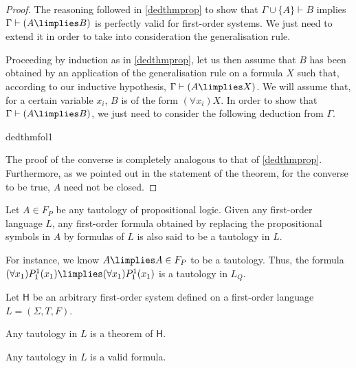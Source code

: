 \begin{proof}
The reasoning followed in \ref{dedthmprop} to show that $\Gamma\cup\{A\} \vdash B$ implies $\Gamma\vdash (A\limplies B)$ is perfectly valid for first-order systems. We just need to extend it in order to take into consideration the generalisation rule.

Proceeding by induction as in \ref{dedthmprop}, let us then assume that $B$ has been obtained by an application of the generalisation rule on a formula $X$ such that, according to our inductive hypothesis, $\Gamma \vdash (A\limplies X)$. We will assume that, for a certain variable $x_i$, $B$ is of the form $(\forall x_i) X$.
In order to show that $\Gamma \vdash  (A \limplies B)$, we just need to consider the following deduction from $\Gamma$.
\begin{deduction}{dedthmfol1}
\end{deduction}

The proof of the converse is completely analogous to that of \ref{dedthmprop}.
Furthermore, as we pointed out in the statement of the theorem, for the converse to be true, $A$ need not be closed.
\end{proof}

\begin{para}
Let $A\in F_P$ be any tautology of propositional logic. Given any first-order language $L$, any first-order formula obtained by replacing the propositional symbols in $A$ by formulas of $L$ is also said to be a tautology in $L$.

For instance, we know $A\limplies A \in F_P$ to be a tautology. Thus, the formula $(\forall x_1) P_1^1(x_1) \limplies (\forall x_1)P^1_1(x_1)$ is a tautology in $L_Q$.
\end{para}

\begin{proposition}
\label{fotaupro}
Let $\mathsf{H}$ be an arbitrary first-order system defined on a first-order language $L = (\Sigma, T, F)$.
\begin{statements}
\item \label{fotauthm} Any tautology in $L$ is a theorem of $\mathsf{H}$.
\item \label{tauval} Any tautology in $L$ is a valid formula.
\end{statements}
\label{tautovalid}
\end{proposition}

